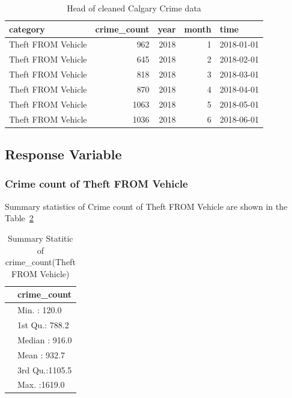 \documentclass[
  letterpaper,
  DIV=11,
  numbers=noendperiod]{scrartcl}
\begin{document}
\begin{longtable}[]{@{}lrrrl@{}}

\caption{\label{tbl-cleaned-data}Head of cleaned Calgary Crime data}

\tabularnewline

\toprule\noalign{}
category & crime\_count & year & month & time \\
\midrule\noalign{}
\endhead
\bottomrule\noalign{}
\endlastfoot
Theft FROM Vehicle & 962 & 2018 & 1 & 2018-01-01 \\
Theft FROM Vehicle & 645 & 2018 & 2 & 2018-02-01 \\
Theft FROM Vehicle & 818 & 2018 & 3 & 2018-03-01 \\
Theft FROM Vehicle & 870 & 2018 & 4 & 2018-04-01 \\
Theft FROM Vehicle & 1063 & 2018 & 5 & 2018-05-01 \\
Theft FROM Vehicle & 1036 & 2018 & 6 & 2018-06-01 \\

\end{longtable}

\subsection{Response Variable}\label{response-variable}

\subsubsection{Crime count of Theft FROM
Vehicle}\label{crime-count-of-theft-from-vehicle}

Summary statistics of Crime count of Theft FROM Vehicle are shown in the
Table~\ref{tbl-response-theftfromvehicle}

\begin{longtable}[]{@{}ll@{}}

\caption{\label{tbl-response-theftfromvehicle}Summary Statitic of
crime\_count(Theft FROM Vehicle)}

\tabularnewline

\toprule\noalign{}
& crime\_count \\
\midrule\noalign{}
\endhead
\bottomrule\noalign{}
\endlastfoot
& Min. : 120.0 \\
& 1st Qu.: 788.2 \\
& Median : 916.0 \\
& Mean : 932.7 \\
& 3rd Qu.:1105.5 \\
& Max. :1619.0 \\

\end{longtable}
\end{document}
